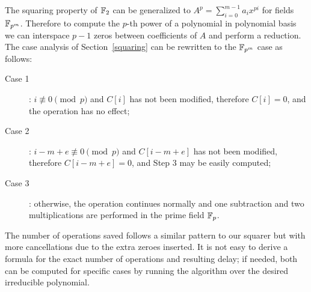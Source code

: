 The squaring property of $\mathbb{F}_2$ can be generalized to $A^p = \sum_{i=0}^{m-1} a_i x^{pi}$ for fields $\mathbb{F}_{p^m}$. Therefore to compute the $p$-th power of a polynomial in polynomial basis we can interspace $p-1$ zeros between coefficients of $A$ and perform a reduction. The case analysis of Section~\ref{squaring} can be rewritten to the $\mathbb{F}_{p^m}$ case as follows: \\

\begin{description}
\item[Case 1]: $i \not\equiv 0 \pmod{p}$ and $C[i]$ has not been modified, therefore $C[i] = 0$, and the operation has no effect;
\item[Case 2]: $i-m+e \not\equiv 0 \pmod{p}$ and $C[i-m+e]$ has not been modified, therefore $C[i-m+e] = 0$, and Step 3 may be easily computed;
\item[Case 3]: otherwise, the operation continues normally and one subtraction and two multiplications are performed in the prime field $\mathbb{F}_p$.
\end{description}
    
The number of operations saved follows a similar pattern to our squarer but with more cancellations due to the extra zeroes inserted. It is not easy to derive a formula for the exact number of operations and resulting delay; if needed, both can be computed for specific cases by running the algorithm over the desired irreducible polynomial. \\